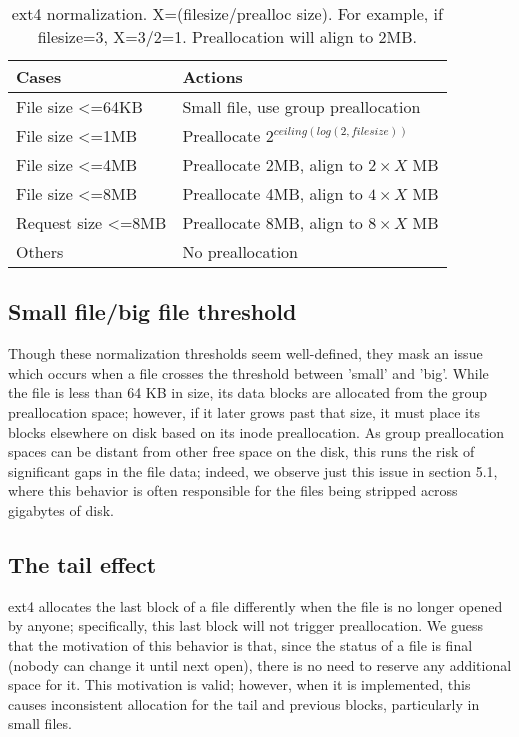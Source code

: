 \documentclass{acm_proc_article-sp}
\begin{document}
\begin{table}[ht]
\caption{ext4 normalization. X=(filesize/prealloc size). For example, if filesize=3, X=3/2=1. Preallocation will align to 2MB.}
\begin{center}
    \begin{tabular}{ | l | p{5cm} |}
    \hline
    \bf{Cases} & \bf{Actions}  \\ \hline
    File size <=64KB & Small file, use group preallocation \\ \hline
    File size <=1MB & Preallocate $2^{ceiling(log(2, filesize))}$ \\ \hline
    File size <=4MB & Preallocate 2MB, align to $2\times X$ MB \\ \hline
    File size <=8MB & Preallocate 4MB, align to $4\times X$ MB \\ \hline
    Request size <=8MB & Preallocate 8MB, align to $8\times X$ MB  \\ \hline
    Others & No preallocation \\ \hline
    
    \end{tabular}
\end{center}
\label{table:normalization}
\end{table}

\subsection{Small file/big file threshold}
Though these normalization thresholds seem well-defined, they mask an issue which occurs when a file crosses the threshold between 'small' and 'big'.  While the file is less than 64 KB in size, its data blocks are allocated from the group preallocation space; however, if it later grows past that size, it must place its blocks elsewhere on disk based on its inode preallocation.  As group preallocation spaces can be distant from other free space on the disk, this runs the risk of significant gaps in the file data; indeed, we observe just this issue in section 5.1, where this behavior is often responsible for the files being stripped across gigabytes of disk.

\subsection{The tail effect}
ext4 allocates the last block of a file differently when the file is no longer opened by anyone; specifically, this last block will not trigger preallocation. We guess that the motivation of this behavior is that, since the status of a file is final (nobody can change it until next open), there is no need to reserve any additional space for it. This motivation is valid; however, when it is implemented, this causes inconsistent allocation for the tail and previous blocks, particularly in small files.
\end{document}
